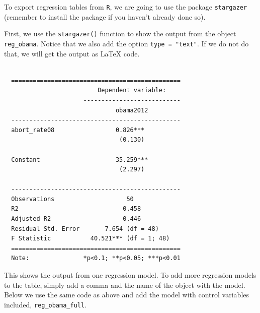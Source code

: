 \documentclass[12pt,oneside]{reedthesis}
\theoremstyle{definition}
\theoremstyle{definition}
\theoremstyle{definition}
\theoremstyle{remark}
\begin{document}
  To export regression tables from \texttt{R}, we are going to use the
  package \texttt{stargazer} (remember to install the package if you
  haven't already done so).
  \begin{Shaded}
  \begin{Highlighting}[]
  \NormalTok{(}\NormalTok{)}
  \end{Highlighting}
  \end{Shaded}
  First, we use the \texttt{stargazer()} function to show the output from
  the object \texttt{reg\_obama}. Notice that we also add the option
  \texttt{type\ =\ "text"}. If we do not do that, we will get the output
  as LaTeX code.
  \begin{Shaded}
  \begin{Highlighting}[]
   \NormalTok{)}
  \end{Highlighting}
  \end{Shaded}
  \begin{verbatim}
  
  ===============================================
                          Dependent variable:    
                      ---------------------------
                               obama2012         
  -----------------------------------------------
  abort_rate08                 0.826***          
                                (0.130)          
                                                 
  Constant                     35.259***         
                                (2.297)          
                                                 
  -----------------------------------------------
  Observations                    50             
  R2                             0.458           
  Adjusted R2                    0.446           
  Residual Std. Error       7.654 (df = 48)      
  F Statistic           40.521*** (df = 1; 48)   
  ===============================================
  Note:               *p<0.1; **p<0.05; ***p<0.01
  \end{verbatim}
  This shows the output from one regression model. To add more regression
  models to the table, simply add a comma and the name of the object with
  the model. Below we use the same code as above and add the model with
  control variables included, \texttt{reg\_obama\_full}.
  \begin{Shaded}
  \begin{Highlighting}[]
   \NormalTok{)}
  \end{Highlighting}
  \end{Shaded}
\end{document}
